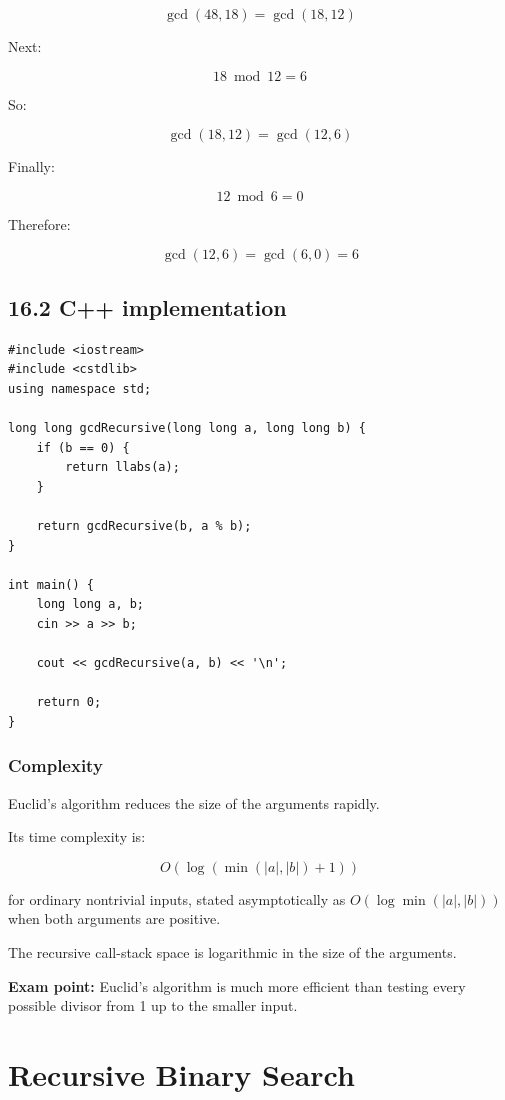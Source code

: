 \[
\gcd(48,18)=\gcd(18,12)
\]


Next:


\[
18\bmod12=6
\]


So:


\[
\gcd(18,12)=\gcd(12,6)
\]


Finally:


\[
12\bmod6=0
\]


Therefore:


\[
\gcd(12,6)=\gcd(6,0)=\boxed{6}
\]


\subsection{16.2 C++ implementation}

\begin{lstlisting}[style=cppstyle]
#include <iostream>
#include <cstdlib>
using namespace std;

long long gcdRecursive(long long a, long long b) {
    if (b == 0) {
        return llabs(a);
    }

    return gcdRecursive(b, a % b);
}

int main() {
    long long a, b;
    cin >> a >> b;

    cout << gcdRecursive(a, b) << '\n';

    return 0;
}
\end{lstlisting}

\subsubsection{Complexity}

Euclid's algorithm reduces the size of the arguments rapidly.

Its time complexity is:


\[
\boxed{O(\log(\min(|a|,|b|)+1))}
\]


for ordinary nontrivial inputs, stated asymptotically as $O(\log \min(|a|,|b|))$ when both arguments are positive.

The recursive call-stack space is logarithmic in the size of the arguments.

\textbf{Exam point:} Euclid's algorithm is much more efficient than testing every possible divisor from 1 up to the smaller input.

\section{Recursive Binary Search}

